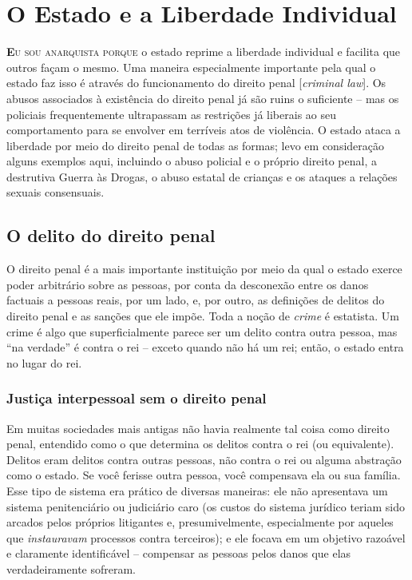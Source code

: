 
\chapter{O Estado e a Liberdade Individual}
\label{chap:5}

\lettrine[lines=2]{\textcolor{LettrineColor}{\textbf{E}}}{u sou anarquista porque} o estado reprime a liberdade individual e facilita que outros façam o mesmo. Uma maneira especialmente importante pela qual o estado faz isso é através do funcionamento do direito penal [\emph{criminal law}]. Os abusos associados à existência do direito penal já são ruins o suficiente -- mas os policiais frequentemente ultrapassam as restrições já liberais ao seu comportamento para se envolver em terríveis atos de violência. O estado ataca a liberdade por meio do direito penal de todas as formas; levo em consideração alguns exemplos aqui, incluindo o abuso policial e o próprio direito penal, a destrutiva Guerra às Drogas, o abuso estatal de crianças e os ataques a relações sexuais consensuais.

\section{O delito do direito penal}

O direito penal é a mais importante instituição por meio da qual o estado exerce poder arbitrário sobre as pessoas, por conta da desconexão entre os danos factuais a pessoas reais, por um lado, e, por outro, as definições de delitos do direito penal e as sanções que ele impõe. Toda a noção de \emph{crime} é estatista. Um crime é algo que superficialmente parece ser um delito contra outra pessoa, mas ``na verdade'' é contra o rei -- exceto quando não há um rei; então, o estado entra no lugar do rei.

\subsection*{Justiça interpessoal sem o direito penal}

Em muitas sociedades mais antigas não havia realmente tal coisa como direito penal, entendido como o que determina os delitos contra o rei (ou equivalente). Delitos eram delitos contra outras pessoas, não contra o rei ou alguma abstração como o estado. Se você ferisse outra pessoa, você compensava ela ou sua família. Esse tipo de sistema era prático de diversas maneiras: ele não apresentava um sistema penitenciário ou judiciário caro (os custos do sistema jurídico teriam sido arcados pelos próprios litigantes e, presumivelmente, especialmente por aqueles que \emph{instauravam} processos contra terceiros); e ele focava em um objetivo razoável e claramente identificável -- compensar as pessoas pelos danos que elas verdadeiramente sofreram.

